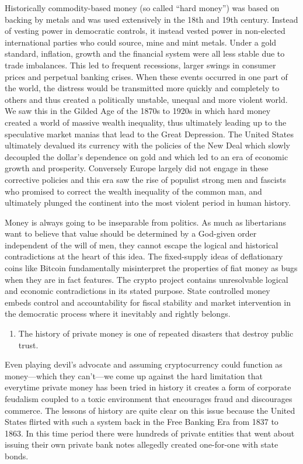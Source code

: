 \documentclass[
]{book}
\providecommand{\tightlist}{%
  \setlength{\itemsep}{0pt}\setlength{\parskip}{0pt}}
\begin{document}
Historically commodity-based money (so called ``hard money'') was based on backing by metals and was used extensively in the 18th and 19th century. Instead of vesting power in democratic controls, it instead vested power in non-elected international parties who could source, mine and mint metals. Under a gold standard, inflation, growth and the financial system were all less stable due to trade imbalances. This led to frequent recessions, larger swings in consumer prices and perpetual banking crises. When these events occurred in one part of the world, the distress would be transmitted more quickly and completely to others and thus created a politically unstable, unequal and more violent world. We saw this in the Gilded Age of the 1870s to 1920s in which hard money created a world of massive wealth inequality, thus ultimately leading up to the speculative market manias that lead to the Great Depression. The United States ultimately devalued its currency with the policies of the New Deal which slowly decoupled the dollar's dependence on gold and which led to an era of economic growth and prosperity. Conversely Europe largely did not engage in these corrective policies and this era saw the rise of populist strong men and fascists who promised to correct the wealth inequality of the common man, and ultimately plunged the continent into the most violent period in human history.

Money is always going to be inseparable from politics. As much as libertarians want to believe that value should be determined by a God-given order independent of the will of men, they cannot escape the logical and historical contradictions at the heart of this idea. The fixed-supply ideas of deflationary coins like Bitcoin fundamentally misinterpret the properties of fiat money as bugs when they are in fact features. The crypto project contains unresolvable logical and economic contradictions in its stated purpose. State controlled money embeds control and accountability for fiscal stability and market intervention in the democratic process where it inevitably and rightly belongs.

\begin{enumerate}
\def\labelenumi{\arabic{enumi}.}
\setcounter{enumi}{2}
\tightlist
\item
  The history of private money is one of repeated disasters that destroy public trust.
\end{enumerate}

Even playing devil's advocate and assuming cryptocurrency could function as money---which they can't---we come up against the hard limitation that everytime private money has been tried in history it creates a form of corporate feudalism coupled to a toxic environment that encourages fraud and discourages commerce. The lessons of history are quite clear on this issue because the United States flirted with such a system back in the Free Banking Era from 1837 to 1863. In this time period there were hundreds of private entities that went about issuing their own private bank notes allegedly created one-for-one with state bonds.
\end{document}
